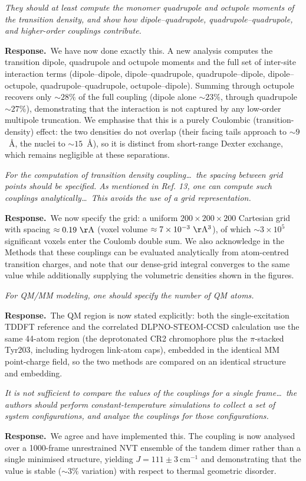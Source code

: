 \documentclass[11pt]{article}
\newcommand{\comment}[1]{\begin{revcomment}\itshape #1\end{revcomment}}
\newcommand{\response}[1]{\noindent\textbf{Response.}\ #1\par\vspace{6pt}}
\begin{document}
\comment{They should at least compute the monomer quadrupole and octupole moments of
the transition density, and show how dipole--quadrupole, quadrupole--quadrupole, and
higher-order couplings contribute.}

\response{We have now done exactly this. A new analysis computes the transition dipole,
quadrupole and octupole moments and the full set of inter-site interaction terms
(dipole--dipole, dipole--quadrupole, quadrupole--dipole, dipole--octupole,
quadrupole--quadrupole, octupole--dipole). Summing through octupole recovers only
${\sim}28\%$ of the full coupling (dipole alone ${\sim}23\%$, through quadrupole
${\sim}27\%$), demonstrating that the interaction is not captured by any low-order
multipole truncation. We emphasise that this is a purely Coulombic (transition-density)
effect: the two densities do not overlap (their facing tails approach to ${\sim}9$~\AA,
the nuclei to ${\sim}15$~\AA), so it is distinct from short-range Dexter exchange, which
remains negligible at these separations.}

\comment{For the computation of transition density coupling\ldots\ the spacing between
grid points should be specified. As mentioned in Ref. 13, one can compute such
couplings analytically\ldots\ This avoids the use of a grid representation.}

\response{We now specify the grid: a uniform $200\times200\times200$ Cartesian grid
with spacing $\approx 0.19~\mathrm{\AA}$ (voxel volume $\approx 7\times10^{-3}~
\mathrm{\AA^{3}}$), of which $\sim3\times10^{5}$ significant voxels enter the Coulomb
double sum. We also acknowledge in the Methods that these couplings can be evaluated
analytically from atom-centred transition charges, and note that our dense-grid
integral converges to the same value while additionally supplying the volumetric
densities shown in the figures.}

\comment{For QM/MM modeling, one should specify the number of QM atoms.}

\response{The QM region is now stated explicitly: both the single-excitation TDDFT
reference and the correlated DLPNO-STEOM-CCSD calculation use the same 44-atom region
(the deprotonated CR2 chromophore plus the $\pi$-stacked Tyr203, including hydrogen
link-atom caps), embedded in the identical MM point-charge field, so the two methods
are compared on an identical structure and embedding.}

\comment{It is not sufficient to compare the values of the couplings for a single
frame\ldots\ the authors should perform constant-temperature simulations to collect a
set of system configurations, and analyze the couplings for those configurations.}

\response{We agree and have implemented this. The coupling is now analysed over a
1000-frame unrestrained NVT ensemble of the tandem dimer rather than a single minimised structure, yielding
$J = 111 \pm 3~\mathrm{cm^{-1}}$ and demonstrating that the value is stable
($\sim3\%$ variation) with respect to thermal geometric disorder.}
\end{document}
